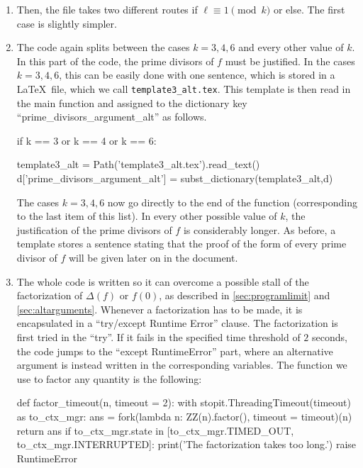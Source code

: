 \documentclass[../main.tex]{subfiles}
\begin{document}
\begin{enumerate}
	Note that the variables that are lists have their key ending with ``\_list''. This will be necessary for a correct displaying of lists in the final \LaTeX \ document.
	\item Then, the file takes two different routes if $\ell\equiv 1\pmod{k}$ or else. The first case is slightly simpler.
	\item The code again splits between the cases $k=3,4,6$ and every other value of $k$. In this part of the code, the prime divisors of $f$ must be justified. In the cases $k=3,4,6$, this can be easily done with one sentence, which is stored in a \LaTeX \ file, which we call \texttt{template3\_alt.tex}. This template is then read in the main function and assigned to the dictionary key ``prime\_divisors\_argument\_alt'' as follows.\\
	
	\begin{python}
		
		if k == 3 or k == 4 or k == 6:
		
		template3_alt = Path('template3_alt.tex').read_text()
		d['prime_divisors_argument_alt'] = subst_dictionary(template3_alt,d)
	\end{python}
	
	The cases $k=3,4,6$ now go directly to the end of the function (corresponding to the last item of this list). In every other possible value of $k$, the justification of the prime divisors of $f$ is considerably longer. As before, a template stores a sentence stating that the proof of the form of every prime divisor of $f$ will be given later on in the document.
	
	\item The whole code is written so it can overcome a possible stall of the factorization of $\Delta(f)$ or $f(0)$, as described in \cref{sec:programlimit} and \cref{sec:altarguments}. Whenever a factorization has to be made, it is encapsulated in a ``try/except Runtime Error'' clause. The factorization is first tried in the ``try''. If it fails in the specified time threshold of $2$ seconds, the code jumps to the ``except RuntimeError'' part, where an alternative argument is instead written in the corresponding variables. The function we use to factor any quantity is the following:\\
	
	\begin{python}
		
		def factor_timeout(n, timeout = 2):
		with stopit.ThreadingTimeout(timeout) as to_ctx_mgr: 
		ans = fork(lambda n: ZZ(n).factor(), timeout = timeout)(n)
		return ans
		if to_ctx_mgr.state in [to_ctx_mgr.TIMED_OUT, to_ctx_mgr.INTERRUPTED]:
		print('The factorization takes too long.')
		raise RuntimeError
	\end{python}
	

\end{enumerate}
\end{document}
